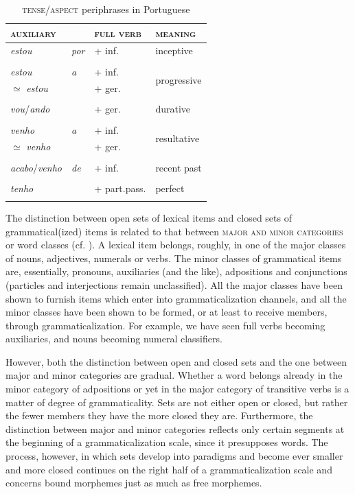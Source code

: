 \begin{table}
\begin{tabular}{llll}
\lsptoprule

\scshape auxiliary  & &  \scshape full verb & \scshape meaning\\
\midrule
\textit{estou} & \textit{por} & + inf. & inceptive\\
\\
\textit{estou} & \textit{a} &  + inf. & \multirow{2}{*}{progressive}\\
${\simeq}$ \textit{estou} & & + ger. \\
\\
\textit{vou}/\textit{ando}  & &  + ger. & durative\\
\\
\textit{venho} & \textit{a} & + inf. & \multirow{2}{*}{resultative}\\
${\simeq}$ \textit{venho}  & &  + ger. \\
\\
\textit{acabo}/\textit{venho} & \textit{de} & + inf. & recent past\\
\\
\textit{tenho}  & & + part.pass. & perfect\\
\lspbottomrule
\end{tabular}
\caption{\textsc{tense/aspect} periphrases in Portuguese}\label{T5} 
\end{table}

\noindent The distinction between open sets of lexical items and closed sets of grammatical(ized) items is related to that between \textsc{major and minor categories} or word classes (cf. \citealt[435f]{Lyons1968}). A lexical item belongs, roughly, in one of the major classes of nouns, adjectives, numerals or verbs. The minor classes of grammatical items are, essentially, pronouns, auxiliaries (and the like), adpositions and conjunctions (particles and interjections remain unclassified). All the major classes have been shown to furnish items which enter into grammaticalization channels, and all the minor classes have been shown to be formed, or at least to receive members, through grammaticalization. For example, we have seen full verbs becoming auxiliaries, and nouns becoming numeral classifiers.

However, both the distinction between open and closed sets and the one between major and minor categories are gradual. Whether a word belongs already in the minor category of adpositions or yet in the major category of transitive verbs is a matter of degree of grammaticality. Sets are not either open or closed, but rather the fewer members they have the more closed they are. Furthermore, the distinction between major and minor categories reflects only certain segments at the beginning of a grammaticalization scale, since it presupposes words. The process, however, in which sets develop into paradigms and become ever smaller and more closed continues on the right half of a grammaticalization scale and concerns bound morphemes just as much as free morphemes.

